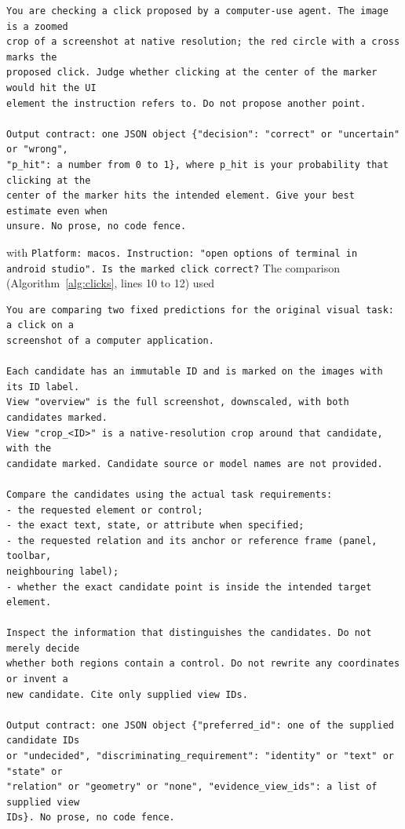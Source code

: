 {\footnotesize
\begin{verbatim}
You are checking a click proposed by a computer-use agent. The image is a zoomed
crop of a screenshot at native resolution; the red circle with a cross marks the
proposed click. Judge whether clicking at the center of the marker would hit the UI
element the instruction refers to. Do not propose another point.

Output contract: one JSON object {"decision": "correct" or "uncertain" or "wrong",
"p_hit": a number from 0 to 1}, where p_hit is your probability that clicking at the
center of the marker hits the intended element. Give your best estimate even when
unsure. No prose, no code fence.
\end{verbatim}
}

\noindent with \texttt{Platform: macos. Instruction: "open options of terminal in android studio". Is the marked click correct?} The comparison (Algorithm~\ref{alg:clicks}, lines 10 to 12) used

{\footnotesize
\begin{verbatim}
You are comparing two fixed predictions for the original visual task: a click on a
screenshot of a computer application.

Each candidate has an immutable ID and is marked on the images with its ID label.
View "overview" is the full screenshot, downscaled, with both candidates marked.
View "crop_<ID>" is a native-resolution crop around that candidate, with the
candidate marked. Candidate source or model names are not provided.

Compare the candidates using the actual task requirements:
- the requested element or control;
- the exact text, state, or attribute when specified;
- the requested relation and its anchor or reference frame (panel, toolbar,
neighbouring label);
- whether the exact candidate point is inside the intended target element.

Inspect the information that distinguishes the candidates. Do not merely decide
whether both regions contain a control. Do not rewrite any coordinates or invent a
new candidate. Cite only supplied view IDs.

Output contract: one JSON object {"preferred_id": one of the supplied candidate IDs
or "undecided", "discriminating_requirement": "identity" or "text" or "state" or
"relation" or "geometry" or "none", "evidence_view_ids": a list of supplied view
IDs}. No prose, no code fence.
\end{verbatim}
}

